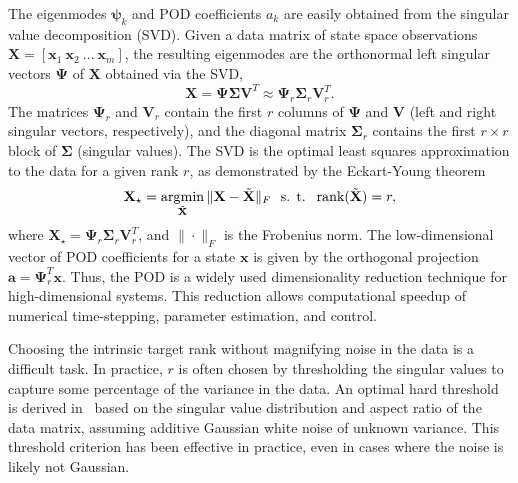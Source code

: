 \documentclass[letterpaper]{IEEEtran}
\newcommand{\ba}{\mathbf{a}}
\newcommand{\bx}{\mathbf{x}}
\newcommand{\bX}{\mathbf{X}}
\newcommand{\bSigma}{\mathbf{\Sigma}}
\newcommand{\bV}{\mathbf{V}}
\newcommand{\bPsi}{\mathbf{\Psi}}
\newcommand{\bpsi}{\boldsymbol\psi}
\DeclareMathOperator*{\argmin}{arg\rm{}min}
\begin{document}
The eigenmodes $\bpsi_k$ and POD coefficients $a_k$ are easily obtained from the singular value decomposition (SVD). Given a data matrix of state space observations $\bX=[\bx_1 ~\bx_2~\dots~\bx_m]$, the resulting eigenmodes are the orthonormal left singular vectors $\bPsi$ of $\bX$ obtained via the SVD,
\begin{equation}
\bX = \mathbf{\Psi\Sigma V}^T\approx \bPsi_r\bSigma_r\bV_r^T.
\end{equation}
The matrices $\bPsi_r$ and $\bV_r$ contain the first $r$ columns of $\bPsi$ and $\bV$ (left and right singular vectors, respectively), and the diagonal matrix $\bSigma_r$ contains the first $r\times r$ block of $\bSigma$ (singular values).  
 The SVD is the optimal least squares approximation to the data for a given rank $r$, as demonstrated by the Eckart-Young theorem~\cite{Eckart1936psych}
\begin{equation}
\bX_\star = \argmin_{\tilde{\bX}}\|\bX - \tilde{\bX}\|_F ~\text{ s. t. }~ \text{rank}(\tilde{\bX})=r, 
\end{equation}
where $\bX_\star = \bPsi_r\bSigma_r\bV_r^T$, and $\|\cdot\|_F$ is the Frobenius norm. %
The low-dimensional vector of POD coefficients for a state $\bx$ is given by the orthogonal projection ${\ba = \bPsi_r^T\bx}$. 
Thus, the POD is a widely used dimensionality reduction technique for high-dimensional systems. This reduction allows computational speedup of numerical time-stepping, parameter estimation, and control. 

Choosing the intrinsic target rank without magnifying noise in the data is a difficult task. In practice, $r$ is often chosen by thresholding the singular values to capture some percentage of the variance in the data. An optimal hard threshold is derived in~\cite{Gavish2014ieeetit} based on the singular value distribution and aspect ratio of the data matrix, assuming additive Gaussian white noise of unknown variance.  This threshold criterion has been effective in practice, even in cases where the noise is likely not Gaussian.
\end{document}
